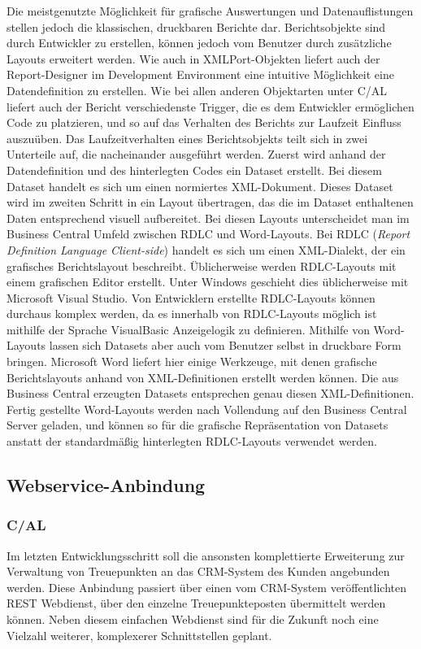 Die meistgenutzte Möglichkeit für grafische Auswertungen und Datenauflistungen stellen jedoch die klassischen, druckbaren Berichte dar. Berichtsobjekte sind durch Entwickler zu erstellen, können jedoch vom Benutzer durch zusätzliche Layouts erweitert werden. Wie auch in XMLPort-Objekten liefert auch der Report-Designer im Development Environment eine intuitive Möglichkeit eine Datendefinition zu erstellen. Wie bei allen anderen Objektarten unter C/AL liefert auch der Bericht verschiedenste Trigger, die es dem Entwickler ermöglichen Code zu platzieren, und so auf das Verhalten des Berichts zur Laufzeit Einfluss auszuüben. Das Laufzeitverhalten eines Berichtsobjekts teilt sich in zwei Unterteile auf, die nacheinander ausgeführt werden. Zuerst wird anhand der Datendefinition und des hinterlegten Codes ein Dataset erstellt. Bei diesem Dataset handelt es sich um einen normiertes XML-Dokument. Dieses Dataset wird im zweiten Schritt in ein Layout übertragen, das die im Dataset enthaltenen Daten entsprechend visuell aufbereitet.
Bei diesen Layouts unterscheidet man im Business Central Umfeld zwischen RDLC und Word-Layouts. Bei RDLC (\textit{Report Definition Language Client-side}) handelt es sich um einen XML-Dialekt, der ein grafisches Berichtslayout beschreibt. Üblicherweise werden RDLC-Layouts mit einem grafischen Editor erstellt. Unter Windows geschieht dies üblicherweise mit Microsoft Visual Studio. Von Entwicklern erstellte RDLC-Layouts können durchaus komplex werden, da es innerhalb von RDLC-Layouts möglich ist mithilfe der Sprache VisualBasic Anzeigelogik zu definieren. Mithilfe von Word-Layouts lassen sich Datasets aber auch vom Benutzer selbst in druckbare Form bringen. Microsoft Word liefert hier einige Werkzeuge, mit denen grafische Berichtslayouts anhand von XML-Definitionen erstellt werden können. Die aus Business Central erzeugten Datasets entsprechen genau diesen XML-Definitionen. Fertig gestellte Word-Layouts werden nach Vollendung auf den Business Central Server geladen, und können so für die grafische Repräsentation von Datasets anstatt der standardmäßig hinterlegten RDLC-Layouts verwendet werden.

\subsection{Webservice-Anbindung}
\subsubsection{C/AL}
Im letzten Entwicklungsschritt soll die ansonsten komplettierte Erweiterung zur Verwaltung von Treuepunkten an das CRM-System des Kunden angebunden werden. Diese Anbindung passiert über einen vom CRM-System veröffentlichten REST Webdienst, über den einzelne Treuepunkteposten übermittelt werden können. Neben diesem einfachen Webdienst sind für die Zukunft noch eine Vielzahl weiterer, komplexerer Schnittstellen geplant. 

